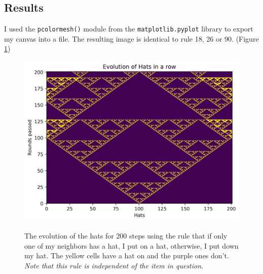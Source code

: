 \documentclass[12pt]{article}
\begin{document}
	\subsection{Results}
	I used the \texttt{pcolormesh()} module from the \texttt{matplotlib.pyplot} library to
	export my canvas into a file. The resulting image is identical to rule 18, 26 or 90. (Figure \ref{fig:hats200})
	\begin{figure}[h!]
		\includegraphics[width=\linewidth]{../P1/Hats200.jpg}
		\label{fig:hats200}
		\caption{The evolution of the hats for 200 steps using the rule that if only one of
							my neighbors has a hat, I put on a hat, otherwise, I put down my hat. The yellow cells have a hat on and the purple ones don't.
							\emph{Note that this rule is independent of the item in question.}}
	\end{figure}

	
	
\end{document}
